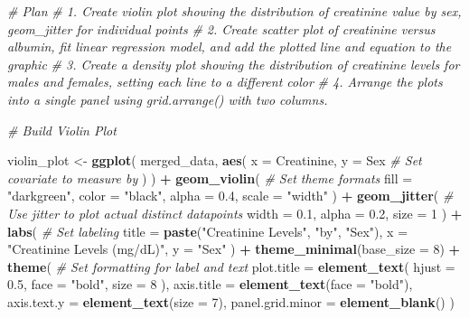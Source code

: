 \documentclass[
]{article}
\newenvironment{Shaded}{\begin{snugshade}}{\end{snugshade}}
\newcommand{\AttributeTok}[1]{\textcolor[rgb]{0.13,0.29,0.53}{#1}}
\newcommand{\CommentTok}[1]{\textcolor[rgb]{0.56,0.35,0.01}{\textit{#1}}}
\newcommand{\DecValTok}[1]{\textcolor[rgb]{0.00,0.00,0.81}{#1}}
\newcommand{\FloatTok}[1]{\textcolor[rgb]{0.00,0.00,0.81}{#1}}
\newcommand{\FunctionTok}[1]{\textcolor[rgb]{0.13,0.29,0.53}{\textbf{#1}}}
\newcommand{\NormalTok}[1]{#1}
\newcommand{\OtherTok}[1]{\textcolor[rgb]{0.56,0.35,0.01}{#1}}
\newcommand{\SpecialCharTok}[1]{\textcolor[rgb]{0.81,0.36,0.00}{\textbf{#1}}}
\newcommand{\StringTok}[1]{\textcolor[rgb]{0.31,0.60,0.02}{#1}}
\begin{document}
\begin{Shaded}
\begin{Highlighting}[]
\CommentTok{\# Plan}
\CommentTok{\# 1. Create violin plot showing the distribution of creatinine value by sex, geom\_jitter for individual points}
\CommentTok{\# 2. Create scatter plot of creatinine versus albumin, fit linear regression model, and add the plotted line and equation to the graphic}
\CommentTok{\# 3. Create a density plot showing the distribution of creatinine levels for males and females, setting each line to a different color}
\CommentTok{\# 4. Arrange the plots into a single panel using grid.arrange() with two columns.}

\CommentTok{\# Build Violin Plot}

\NormalTok{violin\_plot }\OtherTok{\textless{}{-}} \FunctionTok{ggplot}\NormalTok{(}
\NormalTok{    merged\_data,}
    \FunctionTok{aes}\NormalTok{(}
      \AttributeTok{x =}\NormalTok{ Creatinine,}
      \AttributeTok{y =}\NormalTok{ Sex  }\CommentTok{\# Set covariate to measure by}
\NormalTok{    )}
\NormalTok{    ) }\SpecialCharTok{+}
    \FunctionTok{geom\_violin}\NormalTok{( }\CommentTok{\# Set theme formats }
      \AttributeTok{fill =} \StringTok{"darkgreen"}\NormalTok{,}
      \AttributeTok{color =} \StringTok{"black"}\NormalTok{,}
      \AttributeTok{alpha =} \FloatTok{0.4}\NormalTok{,}
      \AttributeTok{scale =} \StringTok{"width"}
\NormalTok{    ) }\SpecialCharTok{+}
    \FunctionTok{geom\_jitter}\NormalTok{( }\CommentTok{\# Use jitter to plot actual distinct datapoints}
      \AttributeTok{width =} \FloatTok{0.1}\NormalTok{, }
      \AttributeTok{alpha =} \FloatTok{0.2}\NormalTok{,}
      \AttributeTok{size =} \DecValTok{1}
\NormalTok{    ) }\SpecialCharTok{+}
    \FunctionTok{labs}\NormalTok{( }\CommentTok{\# Set labeling}
      \AttributeTok{title =} \FunctionTok{paste}\NormalTok{(}\StringTok{"Creatinine Levels"}\NormalTok{, }\StringTok{"by"}\NormalTok{, }\StringTok{"Sex"}\NormalTok{),}
      \AttributeTok{x =} \StringTok{"Creatinine Levels (mg/dL)"}\NormalTok{,}
      \AttributeTok{y =} \StringTok{"Sex"}
\NormalTok{    ) }\SpecialCharTok{+}
    \FunctionTok{theme\_minimal}\NormalTok{(}\AttributeTok{base\_size =} \DecValTok{8}\NormalTok{) }\SpecialCharTok{+}
    \FunctionTok{theme}\NormalTok{( }\CommentTok{\# Set formatting for label and text}
      \AttributeTok{plot.title =} \FunctionTok{element\_text}\NormalTok{(}
        \AttributeTok{hjust =} \FloatTok{0.5}\NormalTok{,}
        \AttributeTok{face =} \StringTok{"bold"}\NormalTok{,}
        \AttributeTok{size =} \DecValTok{8}
\NormalTok{      ),}
    \AttributeTok{axis.title =} \FunctionTok{element\_text}\NormalTok{(}\AttributeTok{face =} \StringTok{"bold"}\NormalTok{),}
    \AttributeTok{axis.text.y =} \FunctionTok{element\_text}\NormalTok{(}\AttributeTok{size =} \DecValTok{7}\NormalTok{),}
    \AttributeTok{panel.grid.minor =} \FunctionTok{element\_blank}\NormalTok{()}
\NormalTok{    )}


\end{Highlighting}
\end{Shaded}
\end{document}
